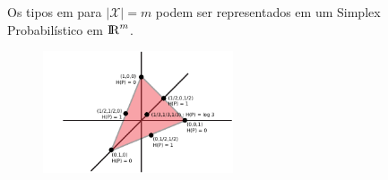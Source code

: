 \begin{frame}[allowframebreaks]
  \framebreak
  Os tipos em para $\vert \mathcal{X} \vert = m$ podem ser representados em um Simplex Probabilístico em ${\rm I\!R}^m$.
  \begin{example}[$\vert \mathcal{X} \vert = 3$]
    \begin{figure}[h!]
    \centering
    \includegraphics[width=0.5\textwidth]{images/prob-simplex-types3.pdf}
    \label{fig:prob-simplex-3}
    \end{figure}
  \end{example}

\end{frame}


